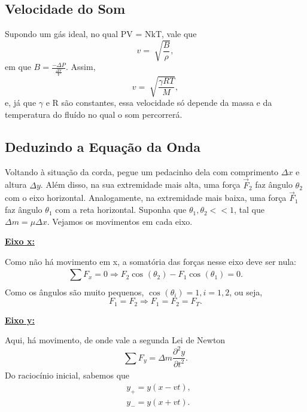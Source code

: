 \documentclass[physicsII_notes.tex]{subfiles}
\begin{document}
\subsection{Velocidade do Som}
Supondo um gás ideal, no qual PV = NkT, vale que
\[
	v = \sqrt[]{\frac{B}{\rho }},
\]
em que \(B = \frac{-\Delta P}{\frac{\Delta V}{V}}.\) Assim,
\[
	v = \sqrt[]{\frac{\gamma RT}{M}},
\]
e, já que \(\gamma \) e R são constantes, essa velocidade só depende da massa e da temperatura do fluído no qual
o som percorrerá.
\subsection{Deduzindo a Equação da Onda}
Voltando à situação da corda, pegue um pedacinho dela com comprimento \(\Delta x\) e altura \(\Delta y\). Além disso,
na sua extremidade mais alta, uma força \(\vec{F}_{2}\) faz ângulo \(\theta_{2}\) com o eixo horizontal. Analogamente,
na extremidade mais baixa, uma força \(\vec{F}_{1}\) faz ângulo \(\theta_{1}\) com a reta horizontal. Suponha que
\(\theta_{1}, \theta_{2} << 1\), tal que \(\Delta m = \mu\Delta x.\) Vejamos os movimentos em cada eixo.

\underline{\textbf{Eixo x:}}

Como não há movimento em x, a somatória das forças nesse eixo deve ser nula:
\[
	\sum\limits_{}^{}F_{x} = 0 \Rightarrow F_{2}\cos^{}{(\theta_{2})} - F_{1}\cos^{}{(\theta_{1})} = 0.
\]
Como os ângulos são muito pequenos, \(\cos^{}{(\theta_{i})} = 1,  i=1, 2\), ou seja,
\[
	F_{1} = F_{2} \Rightarrow F_{1} = F_{2} = F_{T}.
\]

\underline{\textbf{Eixo y:}}

Aqui, há movimento, de onde vale a segunda Lei de Newton
\[
	\sum\limits_{}^{}F_{y} = \Delta m \frac{\partial^{2}y}{\partial t^{2}}.
\]
Do raciocínio inicial, sabemos que
\begin{align*}
	 & y_{+} = y(x-vt), \\
	 & y_{-} = y(x+vt).
\end{align*}
\end{document}
